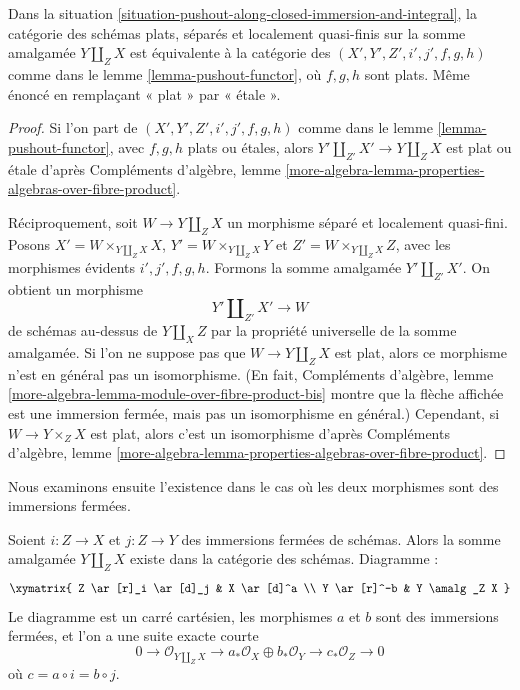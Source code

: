 \begin{lemma}
\label{lemma-pushout-functor-equivalence-flat}
Dans la situation \ref{situation-pushout-along-closed-immersion-and-integral},
la catégorie des schémas plats, séparés et localement quasi-finis
sur la somme amalgamée $Y \amalg_Z X$ est équivalente à la catégorie des
$(X', Y', Z', i', j', f, g, h)$ comme dans le lemme \ref{lemma-pushout-functor},
où $f, g, h$ sont plats. Même énoncé en remplaçant « plat » par
« \'etale ».
\end{lemma}

\begin{proof}
Si l'on part de $(X', Y', Z', i', j', f, g, h)$
comme dans le lemme \ref{lemma-pushout-functor}, avec $f, g, h$ plats
ou \'etales, alors $Y' \amalg_{Z'} X' \to Y \amalg_Z X$ est plat
ou \'etale d'après Compléments d'algèbre, lemme
\ref{more-algebra-lemma-properties-algebras-over-fibre-product}.

\medskip\noindent
Réciproquement, soit
$W \to Y \amalg_Z X$ un morphisme séparé et localement quasi-fini.
Posons $X' = W \times_{Y \amalg_Z X} X$, $Y' = W \times_{Y \amalg_Z X} Y$ et
$Z' = W \times_{Y \amalg_Z X} Z$, avec les morphismes évidents $i', j', f, g, h$.
Formons la somme amalgamée $Y' \amalg_{Z'} X'$. On obtient un morphisme
$$
Y' \amalg_{Z'} X' \longrightarrow W
$$
de schémas au-dessus de $Y \amalg_X Z$ par la propriété universelle de la
somme amalgamée. Si l'on ne suppose pas que $W \to Y \amalg_Z X$ est plat,
alors ce morphisme n'est en général pas un isomorphisme.
(En fait, Compléments d'algèbre, lemme
\ref{more-algebra-lemma-module-over-fibre-product-bis}
montre que la flèche affichée est une immersion fermée, mais pas un isomorphisme
en général.) Cependant, si $W \to Y \times_Z X$ est plat, alors
c'est un isomorphisme d'après Compléments d'algèbre, lemme
\ref{more-algebra-lemma-properties-algebras-over-fibre-product}.
\end{proof}

\noindent
Nous examinons ensuite l'existence dans le cas où
les deux morphismes sont des immersions fermées.

\begin{lemma}
\label{lemma-pushout-along-closed-immersions}
Soient $i : Z \to X$ et $j : Z \to Y$ des immersions fermées de schémas.
Alors la somme amalgamée $Y \amalg_Z X$ existe dans la catégorie des schémas. Diagramme :
$$
\xymatrix{
Z \ar[r]_i \ar[d]_j & X \ar[d]^a \\
Y \ar[r]^-b & Y \amalg_Z X
}
$$
Le diagramme est un carré cartésien, les morphismes $a$ et $b$
sont des immersions fermées, et l'on a une suite exacte courte
$$
0 \to \mathcal{O}_{Y \amalg_Z X} \to
a_*\mathcal{O}_X \oplus b_*\mathcal{O}_Y \to
c_*\mathcal{O}_Z \to 0
$$
où $c = a \circ i = b \circ j$.
\end{lemma}

